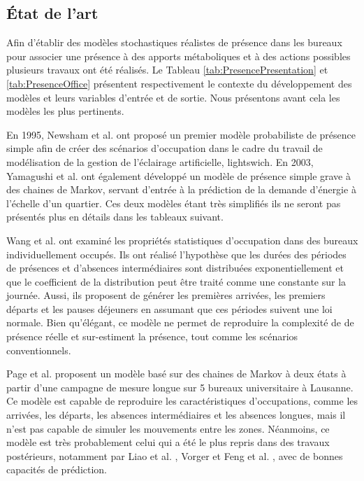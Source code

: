 \subsection{État de l'art}

Afin d'établir des modèles stochastiques réalistes de présence dans les bureaux pour associer une présence à des apports métaboliques et à des actions possibles plusieurs travaux ont été réalisés. Le Tableau \ref{tab:PresencePresentation} et \ref{tab:PresenceOffice} présentent respectivement le contexte du développement des modèles et leurs variables d'entrée et de sortie. Nous présentons avant cela les modèles les plus pertinents. 

En 1995, Newsham et al. \cite{Newsham-95} ont proposé un premier modèle probabiliste de présence simple afin de créer des scénarios d'occupation dans le cadre du travail de modélisation de la gestion de l'éclairage artificielle, lightswich. En 2003, Yamagushi et al. \cite{Yamaguchi-03} ont également développé un modèle de présence simple grave à des chaines de Markov, servant d'entrée à la prédiction de la demande d'énergie à l'échelle d'un quartier. Ces deux modèles étant très simplifiés ils ne seront pas présentés plus en détails dans les tableaux suivant.

Wang et al. \cite{Wang-05} ont examiné les propriétés statistiques d'occupation dans des bureaux individuellement occupés. Ils ont réalisé l'hypothèse que les durées des périodes de présences et d'absences intermédiaires sont distribuées exponentiellement et que le coefficient de la distribution peut être traité comme une constante sur la journée. Aussi, ils proposent de générer les premières arrivées, les premiers départs et les pauses déjeuners en assumant que ces périodes suivent une loi normale. Bien qu'élégant, ce modèle ne permet de reproduire la complexité de de présence réelle et sur-estiment la présence, tout comme les scénarios conventionnels.

Page et al. \cite{Page-08} proposent un modèle basé sur des chaines de Markov à deux états à partir d'une campagne de mesure longue sur 5 bureaux universitaire à Lausanne. Ce modèle est capable de reproduire les caractéristiques d'occupations, comme les arrivées, les départs, les absences intermédiaires et les absences longues, mais il n'est pas capable de simuler les mouvements entre les zones. Néanmoins, ce modèle est très probablement celui qui a été le plus repris dans des travaux postérieurs, notamment par Liao et al. \cite{Liao-11}, Vorger \cite{Vorger-14} et Feng et al. \cite{Feng-15}, avec de bonnes capacités de prédiction.

